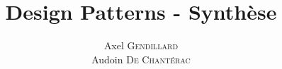 

\rhead{\today}
\lfoot{}
\cfoot{\thepage /\pageref{LastPage}}
\rfoot{}%



\title{\Huge{\textbf{Design Patterns - Synthèse}}}
\author{
	\Large{Axel \textsc{Gendillard}}\\
	\Large{Audoin \textsc{De Chantérac}}
}
\date{}
























